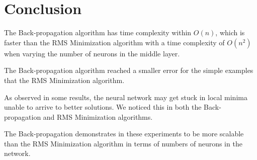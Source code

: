 \documentclass[11pt]{article}
\begin{document}


\section{Conclusion} %
\label{sec:conclusion}

The Back-propagation algorithm has time complexity within $O(n)$, which is faster than the RMS Minimization algorithm with a time
complexity of $O(n^{2})$ when varying the number of neurons in the middle layer. 

The Back-propagation algorithm reached a smaller error for the simple examples that the RMS Minimization algorithm.

As observed in some results, the neural network may get stuck in local minima unable to arrive to better solutions. We noticed this in
both the Back-propagation and RMS Minimization algorithms.

The Back-propagation demonstrates in these experiments to be more scalable than the RMS Minimization algorithm in terms of numbers of
neurons in the network.



\end{document}

